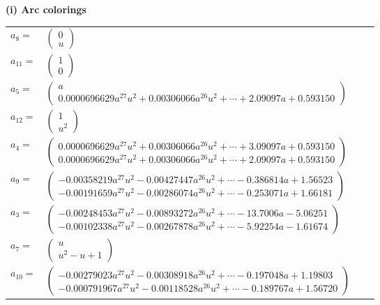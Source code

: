 \documentclass[1p]{elsarticle_modified}
\theoremstyle{definition}
\begin{document}
\flushleft \textbf{(i) Arc colorings}\\
\begin{tabular}{m{7pt} m{180pt} m{7pt} m{180pt} }
\flushright $a_{8}=$&$\begin{pmatrix}0\\u\end{pmatrix}$ \\
\flushright $a_{11}=$&$\begin{pmatrix}1\\0\end{pmatrix}$ \\
\flushright $a_{5}=$&$\begin{pmatrix}a\\0.0000696629 a^{27} u^{2}+0.00306066 a^{26} u^{2}+\cdots+2.09097 a+0.593150\end{pmatrix}$ \\
\flushright $a_{12}=$&$\begin{pmatrix}1\\u^2\end{pmatrix}$ \\
\flushright $a_{4}=$&$\begin{pmatrix}0.0000696629 a^{27} u^{2}+0.00306066 a^{26} u^{2}+\cdots+3.09097 a+0.593150\\0.0000696629 a^{27} u^{2}+0.00306066 a^{26} u^{2}+\cdots+2.09097 a+0.593150\end{pmatrix}$ \\
\flushright $a_{9}=$&$\begin{pmatrix}-0.00358219 a^{27} u^{2}-0.00427447 a^{26} u^{2}+\cdots-0.386814 a+1.56523\\-0.00191659 a^{27} u^{2}-0.00286074 a^{26} u^{2}+\cdots-0.253071 a+1.66181\end{pmatrix}$ \\
\flushright $a_{3}=$&$\begin{pmatrix}-0.00248453 a^{27} u^{2}-0.00893272 a^{26} u^{2}+\cdots-13.7006 a-5.06251\\-0.00102338 a^{27} u^{2}-0.00267878 a^{26} u^{2}+\cdots-5.92254 a-1.61674\end{pmatrix}$ \\
\flushright $a_{7}=$&$\begin{pmatrix}u\\u^2- u+1\end{pmatrix}$ \\
\flushright $a_{10}=$&$\begin{pmatrix}-0.00279023 a^{27} u^{2}-0.00308918 a^{26} u^{2}+\cdots-0.197048 a+1.19803\\-0.000791967 a^{27} u^{2}-0.00118528 a^{26} u^{2}+\cdots-0.189767 a+1.56720\end{pmatrix}$ \\

\end{tabular}
\end{document}
